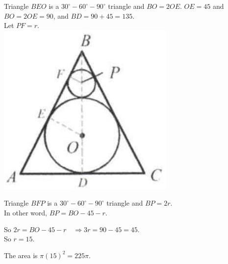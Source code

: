 \documentclass{article}
\begin{document}
Triangle \(B E O\) is a \(30^{\circ}-60^{\circ}-90^{\circ}\) triangle and \(B O=2 O E\). \(O E=45\) and \(B O=2 O E=90\), and \(B D=90+45=135\).\\
Let \(P F=r\).\\
\centering
\includegraphics[width=\textwidth]{images/187(2).jpg}

Triangle \(B F P\) is a \(30^{\circ}-60^{\circ}-90^{\circ}\) triangle and \(B P=2 r\).\\
In other word, \(B P=B O-45-r\).

So \(2 r=B O-45-r \quad \Rightarrow 3 r=90-45=45\).\\
So \(r=15\).

The area is \(\pi(15)^{2}=225 \pi\).
\end{document}
